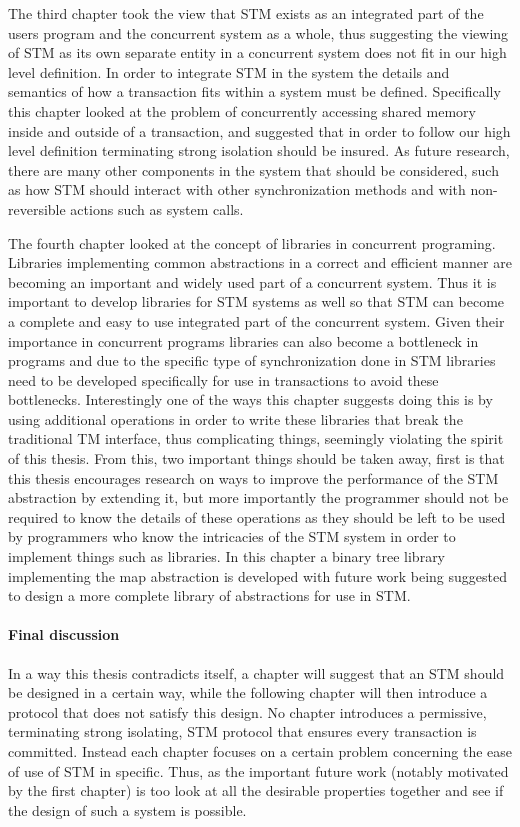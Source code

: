 The third chapter took the view that STM exists as an integrated part
of the users program and the concurrent system as a whole, thus
suggesting the viewing of STM as its own separate entity in a concurrent system does not fit
in our high level definition.
In order to integrate STM in the system the details and semantics of how a transaction
fits within a system must be defined.
Specifically this chapter looked at the problem of concurrently accessing
shared memory inside and outside of a transaction, and suggested that in order
to follow our high level definition terminating strong isolation should be insured.
As future research, there are many other components in the system that should be considered,
such as how STM should interact with other synchronization methods
and with non-reversible actions such as system calls.


The fourth chapter looked at the concept of libraries in concurrent programing.
Libraries implementing common abstractions in a correct and efficient
manner are becoming an important and widely used part of a concurrent system.
Thus it is important to develop libraries for STM systems as well so that STM can become
a complete and easy to use integrated part of the concurrent system.
Given their importance in concurrent programs libraries can also become a bottleneck
in programs and due to the specific type of synchronization done in STM
libraries need to be developed specifically for use in transactions to avoid these bottlenecks.
Interestingly one of the ways this chapter suggests doing this is by using additional
operations in order to write these libraries that break the traditional TM interface, thus complicating things, seemingly
violating the spirit of this thesis.
From this, two important things should be taken away, first is that this thesis encourages
research on ways to improve the performance of the STM abstraction by extending it, but more importantly
the programmer should not be required to know the details of these operations as they should be left to be used by programmers
who know the intricacies of the STM system in order to implement things such as libraries.
In this chapter a binary tree library implementing the map abstraction is developed
with future work being suggested to design a more complete library of abstractions for use in STM.


\paragraph{Final discussion}
In a way this thesis contradicts itself, a chapter will suggest that an STM should
be designed in a certain way, while the following chapter will then introduce
a protocol that does not satisfy this design.
No chapter introduces a permissive, terminating strong isolating, STM protocol that ensures
every transaction is committed.
Instead each chapter focuses on a certain problem concerning the ease of use of STM
in specific.
Thus, as the important future work (notably motivated by the first chapter) is too look at all the desirable
properties together and see if the design of such a system is possible.


